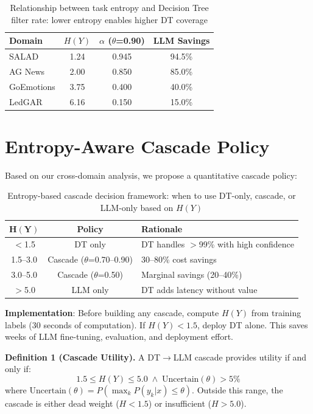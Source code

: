 \documentclass[review,3p]{elsarticle}
\begin{document}
\begin{table}[!ht]
\centering
\caption{Relationship between task entropy and Decision Tree filter rate: lower entropy enables higher DT coverage}
\label{tab:filter}
\begin{tabular}{lccc}
\toprule
\textbf{Domain} & $H(Y)$ & $\alpha$ ($\theta$=0.90) & \textbf{LLM Savings} \\
\midrule
SALAD & 1.24 & 0.945 & 94.5\% \\
AG News & 2.00 & 0.850 & 85.0\% \\
GoEmotions & 3.75 & 0.400 & 40.0\% \\
LedGAR & 6.16 & 0.150 & 15.0\% \\
\bottomrule
\end{tabular}
\end{table}

\section{Entropy-Aware Cascade Policy}

Based on our cross-domain analysis, we propose a quantitative cascade policy:

\begin{table}[!ht]
\centering
\caption{Entropy-based cascade decision framework: when to use DT-only, cascade, or LLM-only based on $H(Y)$}
\label{tab:policy}
\begin{tabular}{ccp{4cm}}
\toprule
$\mathbf{H(Y)}$ & \textbf{Policy} & \textbf{Rationale} \\
\midrule
$<$1.5 & DT only & DT handles $>$99\% with high confidence \\
1.5--3.0 & Cascade ($\theta$=0.70--0.90) & 30--80\% cost savings \\
3.0--5.0 & Cascade ($\theta$=0.50) & Marginal savings (20--40\%) \\
$>$5.0 & LLM only & DT adds latency without value \\
\bottomrule
\end{tabular}
\end{table}

\textbf{Implementation}: Before building any cascade, compute $H(Y)$ from training labels (30 seconds of computation). If $H(Y)<1.5$, deploy DT alone. This saves weeks of LLM fine-tuning, evaluation, and deployment effort.

\noindent\textbf{Definition 1 (Cascade Utility).} A DT$\to$LLM cascade provides utility if and only if:
\begin{equation}
1.5 \leq H(Y) \leq 5.0 \;\wedge\; \text{Uncertain}(\theta) > 5\%
\end{equation}
where $\text{Uncertain}(\theta) = P(\max_k P(y_k|x) \leq \theta)$. Outside this range, the cascade is either dead weight ($H<1.5$) or insufficient ($H>5.0$).
\end{document}
